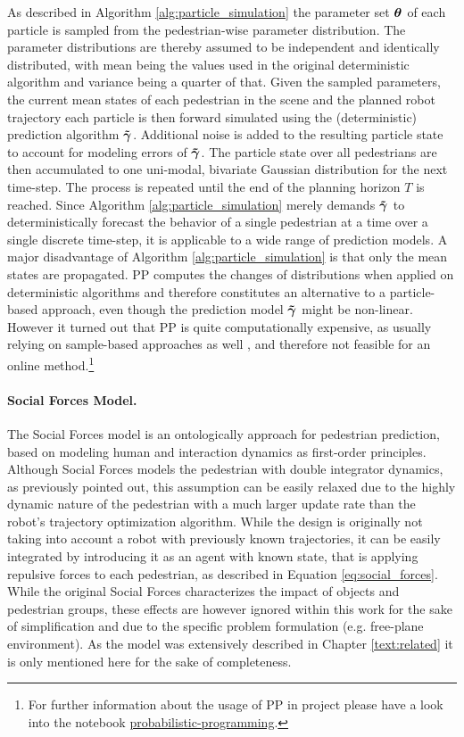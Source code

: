As described in Algorithm \ref{alg:particle_simulation} the parameter set $\pparam[]$ of each particle is sampled from the pedestrian-wise parameter distribution. The parameter distributions are thereby assumed to be independent and identically distributed, with mean being the values used in the original deterministic algorithm and variance being a quarter of that. Given the sampled parameters, the current mean states of each pedestrian in the scene and the planned robot trajectory each particle is then forward simulated using the (deterministic) prediction algorithm $\distmodeldet[]$. Additional noise is added to the resulting particle state to account for modeling errors of $\distmodeldet[]$. The particle state over all pedestrians are then accumulated to one uni-modal, bivariate Gaussian distribution for the next time-step. The process is repeated until the end of the planning horizon $T$ is reached. Since Algorithm \ref{alg:particle_simulation} merely demands $\distmodeldet[]$ to deterministically forecast the behavior of a single pedestrian at a time over a single discrete time-step, it is applicable to a wide range of prediction models. 
\newline
A major disadvantage of Algorithm \ref{alg:particle_simulation} is that only the mean states are propagated. \ac{PP} computes the changes of distributions when applied on deterministic algorithms and therefore constitutes an alternative to a particle-based approach, even though the prediction model $\distmodeldet[]$ might be non-linear. However it turned out that \ac{PP} is quite computationally expensive, as usually relying on sample-based approaches as well \cite{Jensen2007}, and therefore not feasible for an online method.\footnote{For further information about the usage of \ac{PP} in project \project please have a look into the notebook \href{https://github.com/simon-schaefer/mantrap/blob/master/examples/misc/probabilistic_programming.ipynb}{probabilistic-programming}.}
 
\paragraph{Social Forces Model.} The Social Forces model is an ontologically  approach for pedestrian prediction, based on modeling human and interaction dynamics as first-order principles. Although Social Forces models the pedestrian with double integrator dynamics, as previously pointed out, this assumption can be easily relaxed due to the highly dynamic nature of the pedestrian with a much larger update rate than the robot's trajectory optimization algorithm.  While the design is originally not taking into account a robot with previously known trajectories, it can be easily integrated by introducing it as an agent with known state, that is applying repulsive forces to each pedestrian, as described in Equation \ref{eq:social_forces}. While the original Social Forces characterizes the impact of objects and pedestrian groups, these effects are however ignored within this work for the sake of simplification and due to the specific problem formulation (e.g. free-plane environment). As the model was extensively described in Chapter \ref{text:related} it is only mentioned here for the sake of completeness. 

